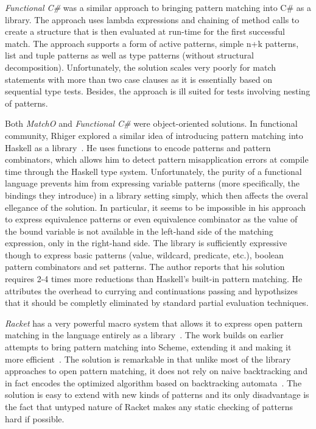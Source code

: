 \emph{Functional C\#} was a similar approach to bringing pattern matching into 
C\# as a library\cite{FuncCSharp}. The approach uses lambda expressions and 
chaining of method calls to create a structure that is then evaluated at 
run-time for the first successful match. The approach supports a form of 
active patterns, simple n+k patterns, list and tuple patterns as well as type 
patterns (without structural decomposition). Unfortunately, the solution scales 
very poorly for match statements with more than two case clauses as it is 
essentially based on sequential type tests. Besides, the approach is ill suited 
for tests involving nesting of patterns.

Both \emph{MatchO} and \emph{Functional C\#} were object-oriented solutions. In 
functional community, Rhiger explored a similar idea of introducing pattern 
matching into Haskell as a library~\cite{Rhiger09}. He uses functions to encode 
patterns and pattern combinators, which allows him to detect pattern 
misapplication errors at compile time through the Haskell type system. 
Unfortunately, the purity of a functional language prevents him from expressing 
variable patterns (more specifically, the bindings they introduce) in a library 
setting simply, which then affects the overal ellegance of the solution. In 
particular, it seems to be impossible in his approach to express equivalence 
patterns or even equivalence combinator as the value of the bound variable is 
not available in the left-hand side of the matching expression, only in the 
right-hand side. The library is sufficiently expressive though to express basic 
patterns (value, wildcard, predicate, etc.), boolean pattern combinators and set 
patterns. The author reports that his solution requires 2-4 times more 
reductions than Haskell's built-in pattern matching. He attributes the overhead 
to currying and continuations passing and hypothsizes that it should be completly 
eliminated by standard partial evaluation techniques.

\emph{Racket} has a very powerful macro system that allows it to express open pattern 
matching in the language entirely as a library~\cite{Tobin-Hochstadt_2010}. 
The work builds on earlier attempts to bring pattern matching into Scheme, 
extending it and making it more efficient~\cite{Wright95}. The solution is 
remarkable in that unlike most of the library approaches to open pattern matching, 
it does not rely on naive backtracking and in fact encodes the optimized 
algorithm based on backtracking automata~\cite{Augustsson85,OPM01}. The solution 
is easy to extend with new kinds of patterns and its only disadvantage is the 
fact that untyped nature of Racket makes any static checking of patterns hard if 
possible.

